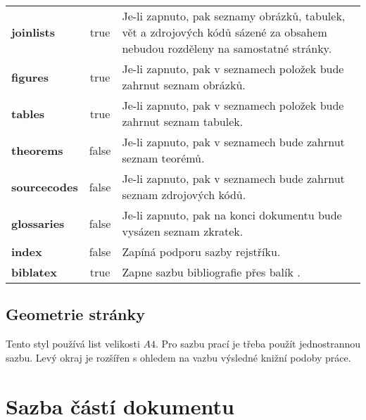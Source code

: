 \documentclass[
  biblatex,
  glossaries,
  index
]{kidiplom}
\begin{document}
\begin{table}
\begin{center}
{\begin{tabular}{>{\bfseries}l >{\ttfamily}c L{8cm}}

joinlists & true & Je-li zapnuto, pak seznamy obrázků, tabulek, vět a
zdrojových kódů sázené za obsahem nebudou rozděleny na samostatné stránky. \\

figures & true & Je-li zapnuto, pak v seznamech položek bude zahrnut seznam obrázků. \\

tables & true & Je-li zapnuto, pak v seznamech položek bude zahrnut seznam tabulek. \\

theorems & false & Je-li zapnuto, pak v seznamech bude zahrnut seznam teorémů. \\

sourcecodes & false & Je-li zapnuto, pak v seznamech bude zahrnut seznam zdrojových kódů. \\

glossaries & false & Je-li zapnuto, pak na konci dokumentu bude vysázen seznam zkratek. \\

index & false & Zapíná podporu sazby rejstříku. \\

biblatex & true & Zapne sazbu bibliografie přes balík \BibLaTeX{}.
\end{tabular}}
\end{center}
\end{table}

\subsection{Geometrie stránky}
Tento styl používá list velikosti $A4$. Pro sazbu prací je třeba použít jednostrannou sazbu. Levý okraj je rozšířen s ohledem na vazbu výsledné knižní podoby práce.









\section{Sazba částí dokumentu}
\end{document}
